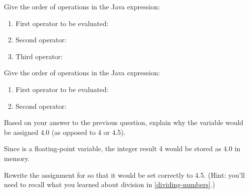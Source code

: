 \Q Give the order of operations in the Java expression: ~ 

\begin{enumerate}[itemsep=2pt]
\item First operator to be evaluated: \ans{\java{-}}
\item Second operator: \ans{\java{*}}
\item Third operator: \ans{\java{=}}
\end{enumerate}


\Q Give the order of operations in the Java expression: ~ 

\begin{enumerate}[itemsep=2pt]
\item First operator to be evaluated: \ans{\java{/}}
\item Second operator: \ans{\java{=}}
\end{enumerate}


\Q Based on your answer to the previous question, explain why the variable  would be assigned 4.0 (as opposed to 4 or 4.5).

\begin{answer}
Since  is a floating-point variable, the integer result 4 would be stored as 4.0 in memory.
\end{answer}


\Q Rewrite the assignment for  so that it would be set correctly to 4.5. (Hint: you'll need to recall what you learned about division in \ref{dividing-numbers}.)

\begin{answer}
\end{answer}
